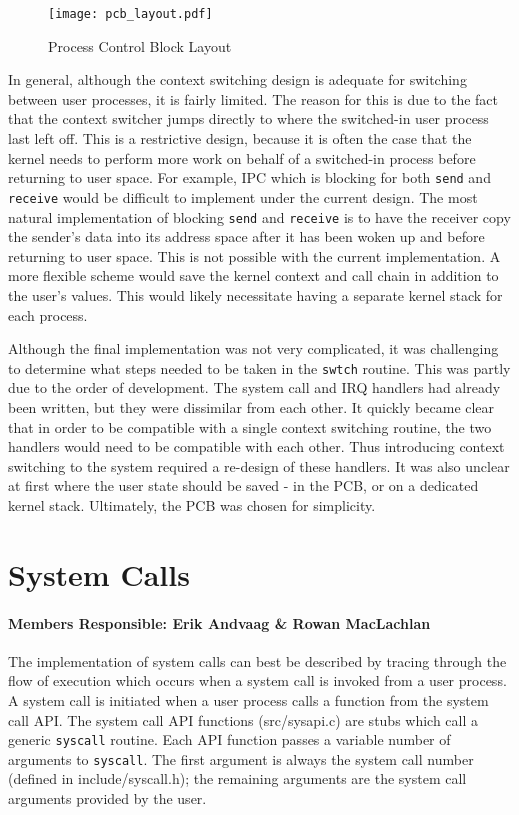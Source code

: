 \documentclass[12pt]{article}
\newcommand{\code}[1]{\colorbox{codegray}{\texttt{\footnotesize{#1}}}}
\begin{document}
\begin{figure}[!htbp]
	\centering
	\texttt{[image: pcb\_layout.pdf]}
	\caption{Process Control Block Layout}
	\label{fig_pcb}
\end{figure}

In general, although the context switching design is adequate for
switching between user processes, it is fairly limited. The reason
for this is due to the fact that the context switcher jumps
directly to where the switched-in user process last left off. This
is a restrictive design, because it is often the case that the
kernel needs to perform more work on behalf of a switched-in
process before returning to user space. For example, IPC which is
blocking for both \code{send} and \code{receive} would be difficult to 
implement under the current design. The most natural implementation
of blocking \code{send} and \code{receive} is to have the receiver copy the
sender's data into its address space after it has been woken up
and before returning to user space. This is not possible with
the current implementation. A more flexible scheme would save the
kernel context and call chain in addition to the user's values.
This would likely necessitate having a separate kernel stack for
each process.

Although the final implementation was not very complicated, it was
challenging to determine what steps needed to be taken in the
\code{swtch} routine. This was partly due to the order of 
development. The system call and IRQ handlers had already been
written, but they were dissimilar from each other. It quickly 
became clear that in order to be compatible with a single
context switching routine, the two handlers would need to be
compatible with each other. Thus introducing context switching to
the system required a re-design of these handlers. It was also
unclear at first where the user state should be saved - in the 
PCB, or on a dedicated kernel stack. Ultimately, the PCB was
chosen for simplicity.

\section{System Calls}\label{system_calls}
\paragraph{Members Responsible: Erik Andvaag \& Rowan MacLachlan}

The implementation of system calls can best be described by tracing
through the flow of execution which occurs when a system call is
invoked from a user process. A system call is initiated when a user
process calls a function from the system call API\@. The system call API
functions (src/sysapi.c) are stubs which call a generic \code{syscall} routine.
Each API function passes a variable number of arguments to \code{syscall}.
The first argument is always the system call number (defined in
include/syscall.h); the remaining arguments are the system call arguments
provided by the user.
\end{document}
